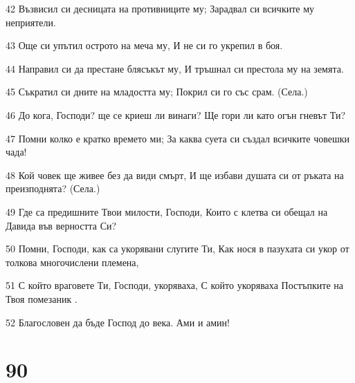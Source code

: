 \par 42 Възвисил си десницата на противниците му; Зарадвал си всичките му неприятели.
\par 43 Още си упътил острото на меча му, И не си го укрепил в боя.
\par 44 Направил си да престане блясъкът му, И тръшнал си престола му на земята.
\par 45 Съкратил си дните на младостта му; Покрил си го със срам. (Села.)
\par 46 До кога, Господи? ще се криеш ли винаги? Ще гори ли като огън гневът Ти?
\par 47 Помни колко е кратко времето ми; За каква суета си създал всичките човешки чада!
\par 48 Кой човек ще живее без да види смърт, И ще избави душата си от ръката на преизподнята? (Села.)
\par 49 Где са предишните Твои милости, Господи, Които с клетва си обещал на Давида във верността Си?
\par 50 Помни, Господи, как са укорявани слугите Ти, Как нося в пазухата си укор от толкова многочислени племена,
\par 51 С който враговете Ти, Господи, укоряваха, С който укоряваха Постъпките на Твоя помезаник .
\par 52 Благословен да бъде Господ до века. Ами и амин!

\chapter{90}


